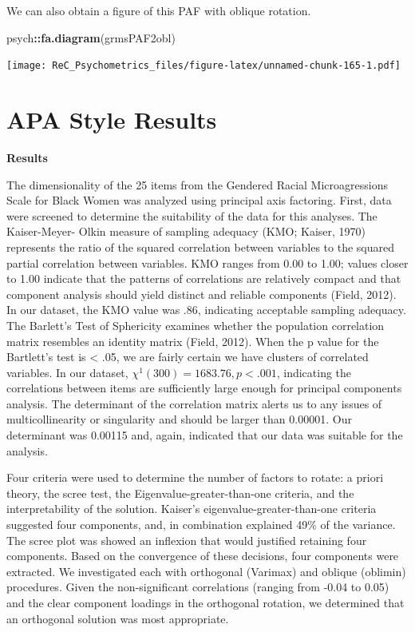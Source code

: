 \documentclass[
  english,
]{book}
\newenvironment{Shaded}{\begin{snugshade}}{\end{snugshade}}
\newcommand{\KeywordTok}[1]{\textcolor[rgb]{0.13,0.29,0.53}{\textbf{#1}}}
\newcommand{\NormalTok}[1]{#1}
\newcommand{\OperatorTok}[1]{\textcolor[rgb]{0.81,0.36,0.00}{\textbf{#1}}}
\begin{document}
We can also obtain a figure of this PAF with oblique rotation.

\begin{Shaded}
\begin{Highlighting}[]
\NormalTok{psych}\OperatorTok{::}\KeywordTok{fa.diagram}\NormalTok{(grmsPAF2obl)}
\end{Highlighting}
\end{Shaded}

\texttt{[image: ReC\_Psychometrics\_files/figure-latex/unnamed-chunk-165-1.pdf]}

\hypertarget{apa-style-results-1}{%
\section{APA Style Results}\label{apa-style-results-1}}

\textbf{Results}

The dimensionality of the 25 items from the Gendered Racial Microagressions Scale for Black Women was analyzed using principal axis factoring. First, data were screened to determine the suitability of the data for this analyses. The Kaiser-Meyer- Olkin measure of sampling adequacy (KMO; Kaiser, 1970) represents the ratio of the squared correlation between variables to the squared partial correlation between variables. KMO ranges from 0.00 to 1.00; values closer to 1.00 indicate that the patterns of correlations are relatively compact and that component analysis should yield distinct and reliable components (Field, 2012). In our dataset, the KMO value was .86, indicating acceptable sampling adequacy. The Barlett's Test of Sphericity examines whether the population correlation matrix resembles an identity matrix (Field, 2012). When the p value for the Bartlett's test is \textless{} .05, we are fairly certain we have clusters of correlated variables. In our dataset, \(\chi ^{1}(300)=1683.76, p < .001\), indicating the correlations between items are sufficiently large enough for principal components analysis. The determinant of the correlation matrix alerts us to any issues of multicollinearity or singularity and should be larger than 0.00001. Our determinant was 0.00115 and, again, indicated that our data was suitable for the analysis.

Four criteria were used to determine the number of factors to rotate: a priori theory, the scree test, the Eigenvalue-greater-than-one criteria, and the interpretability of the solution. Kaiser's eigenvalue-greater-than-one criteria suggested four components, and, in combination explained 49\% of the variance. The scree plot was showed an inflexion that would justified retaining four components. Based on the convergence of these decisions, four components were extracted. We investigated each with orthogonal (Varimax) and oblique (oblimin) procedures. Given the non-significant correlations (ranging from -0.04 to 0.05) and the clear component loadings in the orthogonal rotation, we determined that an orthogonal solution was most appropriate.
\end{document}
